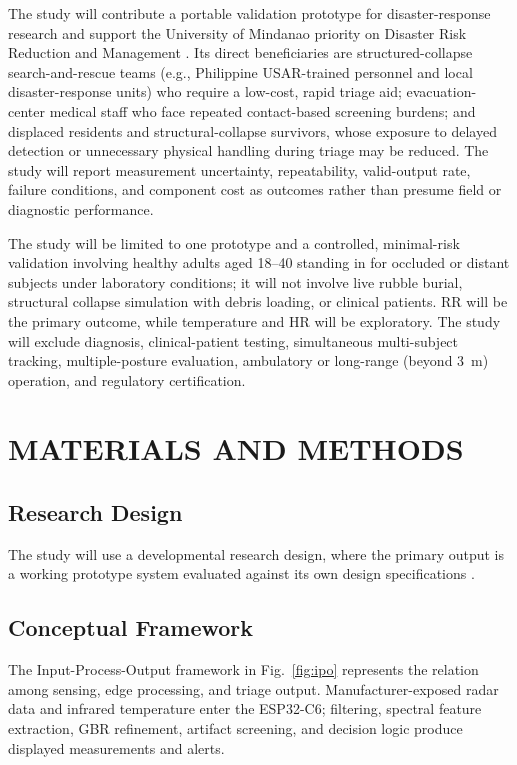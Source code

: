 \documentclass[10pt,conference]{IEEEtran}
\begin{document}
The study will contribute a portable validation prototype for disaster-response research and support the University of Mindanao priority on Disaster Risk Reduction and Management \cite{um2022}. Its direct beneficiaries are structured-collapse search-and-rescue teams (e.g., Philippine USAR-trained personnel and local disaster-response units) who require a low-cost, rapid triage aid; evacuation-center medical staff who face repeated contact-based screening burdens; and displaced residents and structural-collapse survivors, whose exposure to delayed detection or unnecessary physical handling during triage may be reduced. The study will report measurement uncertainty, repeatability, valid-output rate, failure conditions, and component cost as outcomes rather than presume field or diagnostic performance.

The study will be limited to one prototype and a controlled, minimal-risk validation involving healthy adults aged 18--40 standing in for occluded or distant subjects under laboratory conditions; it will not involve live rubble burial, structural collapse simulation with debris loading, or clinical patients. RR will be the primary outcome, while temperature and HR will be exploratory. The study will exclude diagnosis, clinical-patient testing, simultaneous multi-subject tracking, multiple-posture evaluation, ambulatory or long-range (beyond 3~m) operation, and regulatory certification.

\section{MATERIALS AND METHODS}

\subsection{Research Design}
The study will use a developmental research design, where the primary output is a working prototype system evaluated against its own design specifications  \cite{richey2007}. 

\subsection{Conceptual Framework}
The Input-Process-Output framework in Fig.~\ref{fig:ipo} represents the relation among sensing, edge processing, and triage output. Manufacturer-exposed radar data and infrared temperature enter the ESP32-C6; filtering, spectral feature extraction, GBR refinement, artifact screening, and decision logic produce displayed measurements and alerts.
\end{document}
